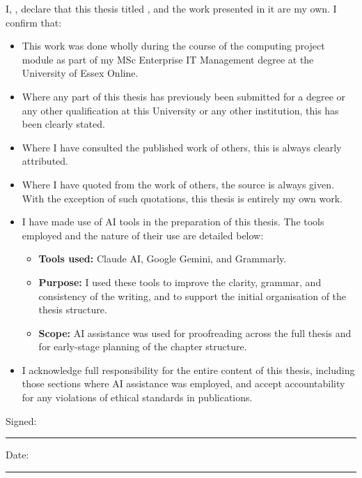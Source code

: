 \noindent I, \authorname, declare that this thesis titled \textit{\ttitle}, and the work presented in it are my own. I confirm that:

\begin{itemize}
  \item This work was done wholly during the course of the computing project module as part of my MSc Enterprise IT Management degree at the University of Essex Online.
  \item Where any part of this thesis has previously been submitted for a degree or any other qualification at this University or any other institution, this has been clearly stated.
  \item Where I have consulted the published work of others, this is always clearly attributed.
  \item Where I have quoted from the work of others, the source is always given. With the exception of such quotations, this thesis is entirely my own work.
  \item I have made use of AI tools in the preparation of this thesis. The tools employed and the nature of their use are detailed below:
    \begin{itemize}
      \item \textbf{Tools used:} Claude AI, Google Gemini, and Grammarly.
      \item \textbf{Purpose:} I used these tools to improve the clarity, grammar, and consistency of the writing, and to support the initial organisation of the thesis structure.
      \item \textbf{Scope:} AI assistance was used for proofreading across the full thesis and for early-stage planning of the chapter structure.
    \end{itemize}
  \item I acknowledge full responsibility for the entire content of this thesis, including those sections where AI assistance was employed, and accept accountability for any violations of ethical standards in publications.
\end{itemize}

\vspace{1cm}

\noindent Signed:\\
\rule[0.5em]{25em}{0.5pt}

\noindent Date:\\
\rule[0.5em]{25em}{0.5pt}
